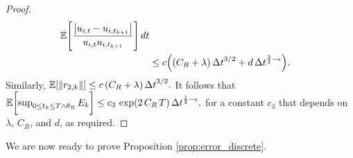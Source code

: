 \documentclass[11pt, twoside]{report}
\begin{document}
\begin{proof}
\begin{align*}
    \EE\bp{\frac{\abs{u_{i,t}- u_{i,t_{k+1}}}}{ u_{i,t} u_{i,t_{k+1}}}}\, dt\\
    &\leq c\pa{ (C_R+\lambda)\,\deltat^{3/2} + d\,\deltat^{\frac32 -\epsilon}}.
\end{align*} 
 Similarly,
$
\mathbb{E}[\left\lVert r_{2,k}\right\rVert] \leq c\, (C_R+\lambda) \,{\Delta t}^{3/2}.
$
It follows that
$
\mathbb{E}\biggl[{\sup_{0\leq t_k\leq T\wedge \theta_R} E_k}\biggr]
\leq c_3\,\exp( 2\,C_R\,T) \,{\Delta t}^{\frac12-\epsilon},
$ for a constant $c_3$ that depends on $\lambda$, $C_R$, and $d$, as required.
\end{proof}
We are now ready to prove Proposition \ref{prop:error_discrete}.
\end{document}
